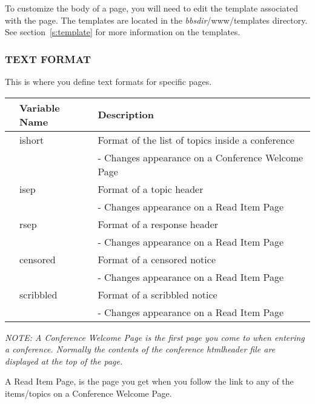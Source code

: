 \documentclass[twoside]{report}
\begin{document}
         \vspace{12pt}
         To customize the body of a page, you will need to edit the template
         associated with the page.  The templates are located in the
         {\em bbsdir}/www/templates directory.  See section~\ref{s:template}
         for more information on the templates.

      \subsubsection*{TEXT FORMAT}

         This is where you define text formats for specific pages.

         \begin{tabular}{lll}
         & Variable Name & Description \\ \hline
         & ishort\index{ishort} & Format of the list of topics inside a conference \\
         && - Changes appearance on a Conference Welcome Page \\

         & isep\index{isep} & Format of a topic header \\
         &&            - Changes appearance on a Read Item Page\\

         & rsep\index{rsep} & Format of a response header \\
         &&         - Changes appearance on a Read Item Page \\

         & censored\index{censored} & Format of a censored notice \\
         &&      - Changes appearance on a Read Item Page \\

         & scribbled\index{scribbled} & Format of a scribbled notice  \\
         &&   - Changes appearance on a Read Item Page\\ \hline
         \end{tabular}

         \vspace{12pt}
         {\em NOTE: A Conference Welcome Page is the first page you come to when
            entering a conference.  Normally the contents of the conference 
            htmlheader file are displayed at the top of the page. 

            A Read Item Page, is the page you get when you follow the link to 
            any of the items/topics on a Conference Welcome Page.
         }
\end{document}

